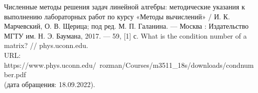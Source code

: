 \documentclass[12pt, a4paper]{article}
\begin{document}

\newpage

\begin{thebibliography}{5}
	 Численные методы решения задач линейной алгебры:
	методические указания к выполнению лабораторных работ по
	курсу «Методы вычислений» / И. К. Марчевский, О. В. Щерица; под ред. М. П. Галанина. — Москва : Издательство МГТУ
	им. Н. Э. Баумана, 2017. — 59, [1] с.
	What is the condition number of a matrix? // phys.uconn.edu.\\
	URL: https://www.phys.uconn.edu/~rozman/Courses/m3511\_18s/downloads/condnumber.pdf \\
	(дата обращения: 18.09.2022).
	
\end{thebibliography}
\end{document}
